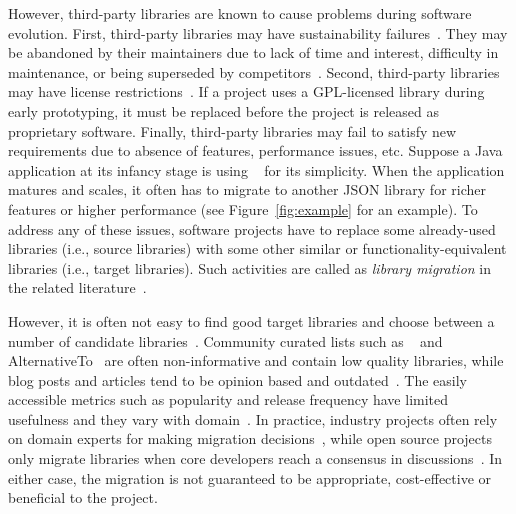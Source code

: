 \documentclass[conference, 10pt]{IEEEtran}
\begin{document}
However, third-party libraries are known to cause problems during software evolution.
First, third-party libraries may have sustainability failures~\cite{2017FSE-Coelho-Why, 2018FSE-Valiev-Ecosystem}. 
They may be abandoned by their maintainers due to lack of time and interest, difficulty in maintenance, or being superseded by competitors~\cite{2017FSE-Coelho-Why}. 
Second, third-party libraries may have license restrictions~\cite{2012IEEESoftware-German-Method, 2014ASE-Van-Tracing}. If a project uses a GPL-licensed library during early prototyping, it must be replaced before the project is released as proprietary software.
Finally, third-party libraries may fail to satisfy new requirements due to absence of features, performance issues, etc. 
Suppose a Java application at its infancy stage is using ~\cite{orgjson} for its simplicity. 
When the application matures and scales, it often has to migrate to another JSON library for richer features or higher performance (see Figure~\ref{fig:example} for an example). 
To address any of these issues, software projects have to replace some already-used libraries (i.e., source libraries) with some other similar or functionality-equivalent libraries (i.e., target libraries). Such activities are  called as \textit{library migration} in the related literature~\cite{2012WCRE-Teyton-Mining, 2013WCRE-Teyton-Automatic, 2014JournalOfSysAndSoft-Teyton-Study, 2016MSR-Kabinna-Logging, 2019ICPC-Alrubaye-On, 2019ICSME-Alrubaye-MigrationMiner, 2019Arxiv-Alrubaye-How, 2020ASC-Alrubaye-Learning}.

However, it is often not easy to find good target libraries and choose between a number of candidate libraries~\cite{2012WCRE-Teyton-Mining, 2016SANER-Chen-Mining, 2018PROMISE-Mora-An}.  
Community curated lists such as ~\cite{awesome-java} and AlternativeTo~\cite{alternative-to} are often non-informative and contain low quality libraries, while blog posts and articles tend to be opinion based and outdated~\cite{2016SANER-Chen-Mining}. 
The easily accessible metrics such as popularity and release frequency have limited usefulness and they vary with domain~\cite{2018PROMISE-Mora-An}. 
In practice, industry projects often rely on domain experts for making migration decisions~\cite{2020FSE-Larios-Selecting}, while open source projects only migrate libraries when core developers reach a consensus in discussions~\cite{2016MSR-Kabinna-Logging}. In either case, the migration is not guaranteed to be appropriate, cost-effective or beneficial to the project.
\end{document}
